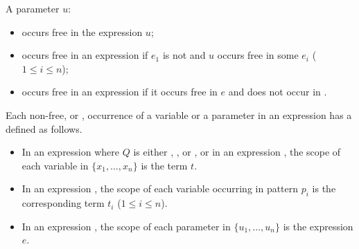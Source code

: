 \noindent A parameter $u$:
\begin{itemize}
\item
occurs free in the expression $u$;
\item
occurs free in an expression 
if $e_1$ is not  and $u$ occurs free in some $e_i$ ($1\le i\le n$); 
\item
occurs free in an expression
if it occurs free in $e$ and does not occur in .
\end{itemize}

\noindent 
Each non-free, or , occurrence of a variable or a parameter 
in an expression has a  defined as follows.

\begin{itemize}
\item
In an expression 
where $Q$ is either , , or , 
or in an expression ,
the scope of each variable in $\{x_1, \ldots, x_n\}$ is the term $t$.
\item
In an expression 
,
the scope of each variable occurring in pattern $p_i$ is the corresponding term $t_i$
($1\le i\le n$).
\item
In an expression 
,
the scope of each parameter in $\{u_1, \ldots, u_n\}$ is the expression $e$.
\end{itemize}

